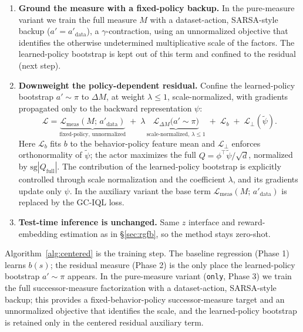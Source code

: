 \documentclass[11pt]{article}
\newcommand{\sg}{\mathrm{sg}}
\begin{document}
\begin{enumerate}
    \item \textbf{Ground the measure with a fixed-policy backup.}
    In the pure-measure variant we train the full measure $M$ with a dataset-action, SARSA-style backup ($a'=a'_{\mathrm{data}}$), a $\gamma$-contraction, using an unnormalized objective that identifies the otherwise undetermined multiplicative scale of the factors.
    The learned-policy bootstrap is kept out of this term and confined to the residual (next step).

    \item \textbf{Downweight the policy-dependent residual.}
    Confine the learned-policy bootstrap $a'\sim\pi$ to $\Delta M$, at weight $\lambda\le1$, scale-normalized, with gradients propagated only to the backward representation $\psi$:
    \begin{equation}
        \mathcal L= \underbrace{\mathcal L_{\mathrm{meas}}(M;\,a'_{\mathrm{data}})}_{\text{fixed-policy, unnormalized}} \;+\;\lambda\,\underbrace{\mathcal L_{\Delta M}\big(a'{\sim}\pi\big)}_{\text{scale-normalized, }\lambda\le1} \;+\;\mathcal L_b\;+\;\mathcal L_\perp(\tilde\psi) .
    \end{equation}
    Here $\mathcal L_b$ fits $b$ to the behavior-policy feature mean and $\mathcal L_\perp$ enforces orthonormality of $\tilde\psi$; the actor maximizes the full $Q=\phi^\top\tilde\psi/\sqrt d$, normalized by $\sg|Q_{\mathrm{full}}|$.
    The contribution of the learned-policy bootstrap is explicitly controlled through scale normalization and the coefficient $\lambda$, and its gradients update only $\psi$.
    In the auxiliary variant the base term $\mathcal L_{\mathrm{meas}}(M;\,a'_{\mathrm{data}})$ is replaced by the GC-IQL loss.

    \item \textbf{Test-time inference is unchanged.}
    Same $z$ interface and reward-embedding estimation as in \S\ref{sec:rgfb}, so the method stays zero-shot.
\end{enumerate}

Algorithm~\ref{alg:centered} is the training step. The baseline regression (Phase 1) learns $b(s)$; the residual measure (Phase 2) is the only place the learned-policy bootstrap $a'\sim\pi$ appears. In the pure-measure variant (\texttt{only}, Phase 3) we train the full successor-measure factorization with a dataset-action, SARSA-style backup; this provides a fixed-behavior-policy successor-measure target and an unnormalized objective that identifies the scale, and the learned-policy bootstrap is retained only in the centered residual auxiliary term.
\end{document}
